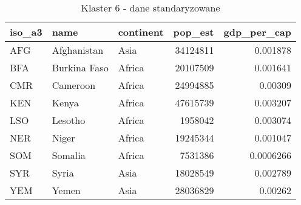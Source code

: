 \begin{table}[h!]
    \centering
    \caption{Klaster 6 - dane standaryzowane}
    \label{tab:cl6std}
    \begin{tabular}{lllrr}
        \toprule
        iso\_a3 & name         & continent & pop\_est & gdp\_per\_cap \\
        \midrule
        AFG     & Afghanistan  & Asia      & 34124811 & 0.001878      \\
        BFA     & Burkina Faso & Africa    & 20107509 & 0.001641      \\
        CMR     & Cameroon     & Africa    & 24994885 & 0.00309       \\
        KEN     & Kenya        & Africa    & 47615739 & 0.003207      \\
        LSO     & Lesotho      & Africa    & 1958042  & 0.003074      \\
        NER     & Niger        & Africa    & 19245344 & 0.001047      \\
        SOM     & Somalia      & Africa    & 7531386  & 0.0006266     \\
        SYR     & Syria        & Asia      & 18028549 & 0.002789      \\
        YEM     & Yemen        & Asia      & 28036829 & 0.00262       \\
        \bottomrule
    \end{tabular}
\end{table}
